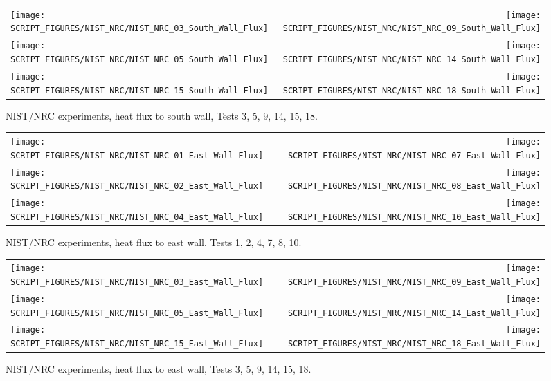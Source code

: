 \begin{figure}[p]
\begin{tabular*}{\textwidth}{l@{\extracolsep{\fill}}r}
\texttt{[image: SCRIPT\_FIGURES/NIST\_NRC/NIST\_NRC\_03\_South\_Wall\_Flux]} &
\texttt{[image: SCRIPT\_FIGURES/NIST\_NRC/NIST\_NRC\_09\_South\_Wall\_Flux]} \\
\texttt{[image: SCRIPT\_FIGURES/NIST\_NRC/NIST\_NRC\_05\_South\_Wall\_Flux]} &
\texttt{[image: SCRIPT\_FIGURES/NIST\_NRC/NIST\_NRC\_14\_South\_Wall\_Flux]} \\
\texttt{[image: SCRIPT\_FIGURES/NIST\_NRC/NIST\_NRC\_15\_South\_Wall\_Flux]} &
\texttt{[image: SCRIPT\_FIGURES/NIST\_NRC/NIST\_NRC\_18\_South\_Wall\_Flux]}
\end{tabular*}
\caption[NIST/NRC experiments, heat flux to south wall, Tests 3, 5, 9, 14, 15, 18]{NIST/NRC experiments, heat flux to south wall, Tests 3, 5, 9, 14, 15, 18.}
\label{NIST_NRC_South_Wall_Flux_Open}
\end{figure}


\begin{figure}[p]
\begin{tabular*}{\textwidth}{l@{\extracolsep{\fill}}r}
\texttt{[image: SCRIPT\_FIGURES/NIST\_NRC/NIST\_NRC\_01\_East\_Wall\_Flux]} &
\texttt{[image: SCRIPT\_FIGURES/NIST\_NRC/NIST\_NRC\_07\_East\_Wall\_Flux]} \\
\texttt{[image: SCRIPT\_FIGURES/NIST\_NRC/NIST\_NRC\_02\_East\_Wall\_Flux]} &
\texttt{[image: SCRIPT\_FIGURES/NIST\_NRC/NIST\_NRC\_08\_East\_Wall\_Flux]} \\
\texttt{[image: SCRIPT\_FIGURES/NIST\_NRC/NIST\_NRC\_04\_East\_Wall\_Flux]} &
\texttt{[image: SCRIPT\_FIGURES/NIST\_NRC/NIST\_NRC\_10\_East\_Wall\_Flux]}
\end{tabular*}
\caption[NIST/NRC experiments, heat flux to east wall, Tests 1, 2, 4, 7, 8, 10]{NIST/NRC experiments, heat flux to east wall, Tests 1, 2, 4, 7, 8, 10.}
\label{NIST_NRC_East_Wall_Flux_Closed}
\end{figure}

\begin{figure}[p]
\begin{tabular*}{\textwidth}{l@{\extracolsep{\fill}}r}
\texttt{[image: SCRIPT\_FIGURES/NIST\_NRC/NIST\_NRC\_03\_East\_Wall\_Flux]} &
\texttt{[image: SCRIPT\_FIGURES/NIST\_NRC/NIST\_NRC\_09\_East\_Wall\_Flux]} \\
\texttt{[image: SCRIPT\_FIGURES/NIST\_NRC/NIST\_NRC\_05\_East\_Wall\_Flux]} &
\texttt{[image: SCRIPT\_FIGURES/NIST\_NRC/NIST\_NRC\_14\_East\_Wall\_Flux]} \\
\texttt{[image: SCRIPT\_FIGURES/NIST\_NRC/NIST\_NRC\_15\_East\_Wall\_Flux]} &
\texttt{[image: SCRIPT\_FIGURES/NIST\_NRC/NIST\_NRC\_18\_East\_Wall\_Flux]}
\end{tabular*}
\caption[NIST/NRC experiments, heat flux to east wall, Tests 3, 5, 9, 14, 15, 18]{NIST/NRC experiments, heat flux to east wall, Tests 3, 5, 9, 14, 15, 18.}
\label{NIST_NRC_East_Wall_Flux_Open}
\end{figure}



